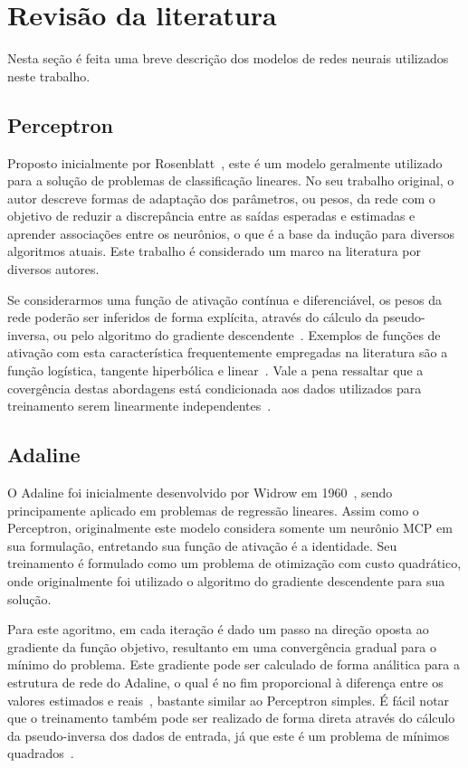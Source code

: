\documentclass[conference]{IEEEtran}
\begin{document}
	\section{Revisão da literatura}
	Nesta seção é feita uma breve descrição dos modelos de redes neurais utilizados neste trabalho.
	
	\subsection{Perceptron}
	Proposto inicialmente por Rosenblatt~\cite{rosenblatt1957perceptron}, este é um modelo geralmente utilizado para a solução de problemas de classificação lineares. No seu trabalho original, o autor descreve formas de adaptação dos parâmetros, ou pesos, da rede com o objetivo de reduzir a discrepância entre as saídas esperadas e estimadas e aprender associações entre os neurônios, o que é a base da indução para diversos algoritmos atuais. Este trabalho é considerado um marco na literatura por diversos autores.
	
	Se considerarmos uma função de ativação contínua e diferenciável, os pesos da rede poderão ser inferidos de forma explícita, através do cálculo da pseudo-inversa, ou pelo algoritmo do gradiente descendente~\cite{hertz1991introduction}. Exemplos de funções de ativação com esta característica frequentemente empregadas na literatura são a função logística, tangente hiperbólica e linear~\cite{jain1996artificial}. Vale a pena ressaltar que a covergência destas abordagens está condicionada aos dados utilizados para treinamento serem linearmente independentes~\cite{hertz1991introduction}.
	
	\subsection{Adaline}
	O Adaline foi inicialmente desenvolvido por Widrow em 1960~\cite{widrow1960adaptive}, sendo principamente aplicado em problemas de regressão lineares. Assim como o Perceptron, originalmente este modelo considera somente um neurônio MCP em sua formulação, entretando sua função de ativação é a identidade. Seu treinamento é formulado como um problema de otimização com custo quadrático, onde originalmente foi utilizado o algoritmo do gradiente descendente para sua solução. 
	
	Para este agoritmo, em cada iteração é dado um passo na direção oposta ao gradiente da função objetivo, resultanto em uma convergência gradual para o mínimo do problema. Este gradiente pode ser calculado de forma análitica para a estrutura de rede do Adaline, o qual é no fim proporcional à diferença entre os valores estimados e reais~\cite{widrow1960adaptive}, bastante similar ao Perceptron simples. É fácil notar que o treinamento também pode ser realizado de forma direta através do cálculo da pseudo-inversa dos dados de entrada, já que este é um problema de mínimos quadrados~\cite{haykin2007neural}.
	
\end{document}
